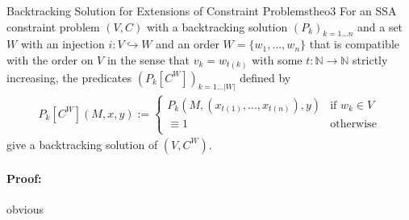 \begin{theorem}{Backtracking Solution for Extensions of Constraint Problems}{theo3}
    For an SSA constraint problem $(V,C)$ with a backtracking
    solution $(P_k)_{k=1\dots n}$ and a set $W$ with an injection
    $i:V\hookrightarrow W$ and an order $W=\{w_1,\dots,w_n\}$ that is
    compatible with the order on $V$ in the sense that $v_k=w_{t(k)}$ with
    some $t:\mathbb N\rightarrow\mathbb N$ strictly increasing, the
    predicates $(P_k[C^W])_{k=1\dots |W|}$ defined by
    \begin{align*}
        P_k[C^W](M,x,y):=\left\{
            \begin{array}{ll}
                P_k\left(M,\left(x_{t(1)},\dots,x_{t(n)}\right),y\right)&\text{if }w_k\in V\\
                \equiv 1&\text{otherwise}\\
            \end{array}\right.
    \end{align*}
    give a backtracking solution of $(V,C^W)$.
    \tcblower
    \paragraph*{Proof:} obvious
\end{theorem}
